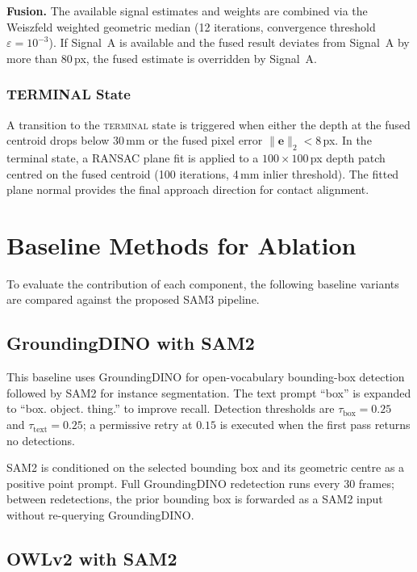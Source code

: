 \documentclass[lettersize,journal]{IEEEtran}
\begin{document}
\textbf{Fusion.}
The available signal estimates and weights are combined via the Weiszfeld
weighted geometric median (12 iterations, convergence threshold
$\varepsilon = 10^{-3}$). If Signal~A is available and the fused result
deviates from Signal~A by more than 80\,px, the fused estimate is overridden
by Signal~A.

\subsubsection{TERMINAL State}
\label{sec:terminal}

A transition to the \textsc{terminal} state is triggered when either the
depth at the fused centroid drops below $30$\,mm or the fused pixel error
$\lVert\mathbf{e}\rVert_2 < 8$\,px. In the terminal state, a RANSAC plane
fit is applied to a $100\times100$\,px depth patch centred on the fused
centroid (100 iterations, 4\,mm inlier threshold). The fitted plane normal
provides the final approach direction for contact alignment.


\section{Baseline Methods for Ablation}
\label{sec:baselines}

To evaluate the contribution of each component, the following baseline
variants are compared against the proposed SAM3 pipeline.

\subsection{GroundingDINO with SAM2}
\label{sec:gdino}

This baseline uses GroundingDINO for open-vocabulary bounding-box
detection followed by SAM2 for instance segmentation. The text prompt
``box'' is expanded to ``box. object. thing.'' to improve recall.
Detection thresholds are $\tau_{\text{box}} = 0.25$ and
$\tau_{\text{text}} = 0.25$; a permissive retry at $0.15$ is executed when
the first pass returns no detections.

SAM2 is conditioned on the selected bounding box and its geometric centre
as a positive point prompt. Full GroundingDINO redetection runs every 30
frames; between redetections, the prior bounding box is forwarded as a
SAM2 input without re-querying GroundingDINO.

\subsection{OWLv2 with SAM2}
\label{sec:owlv2}
\end{document}
